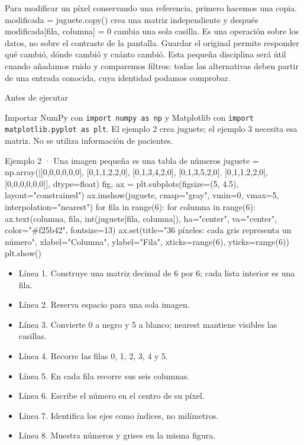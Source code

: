 Para modificar un píxel conservando una referencia, primero hacemos una copia. modificada = juguete.copy() crea una matriz independiente y después modificada[fila, columna] = 0 cambia una sola casilla. Es una operación sobre los datos, no sobre el contraste de la pantalla. Guardar el original permite responder qué cambió, dónde cambió y cuánto cambió. Esta pequeña disciplina será útil cuando añadamos ruido y comparemos filtros: todas las alternativas deben partir de una entrada conocida, cuya identidad podamos comprobar.



\begin{Idea}{Antes de ejecutar}

Importar NumPy con \texttt{import numpy as np} y Matplotlib con \texttt{import matplotlib.pyplot as plt}. El ejemplo 2 crea juguete; el ejemplo 3 necesita esa matriz. No se utiliza información de pacientes.


\end{Idea}

\begin{Codigo}{Ejemplo 2 · Una imagen pequeña es una tabla de números}
juguete = np.array([[0,0,0,0,0,0], [0,1,1,2,2,0], [0,1,3,4,2,0], [0,1,3,5,2,0], [0,1,1,2,2,0], [0,0,0,0,0,0]], dtype=float)
fig, ax = plt.subplots(figsize=(5, 4.5), layout="constrained")
ax.imshow(juguete, cmap="gray", vmin=0, vmax=5, interpolation="nearest")
for fila in range(6):
    for columna in range(6):
        ax.text(columna, fila, int(juguete[fila, columna]), ha="center", va="center", color="#f25b42", fontsize=13)
ax.set(title="36 píxeles: cada gris representa un número", xlabel="Columna", ylabel="Fila", xticks=range(6), yticks=range(6))
plt.show()
\end{Codigo}


\begin{itemize}

\item Línea 1. Construye una matriz decimal de 6 por 6; cada lista interior es una fila.

\item Línea 2. Reserva espacio para una sola imagen.

\item Línea 3. Convierte 0 a negro y 5 a blanco; nearest mantiene visibles las casillas.

\item Línea 4. Recorre las filas 0, 1, 2, 3, 4 y 5.

\item Línea 5. En cada fila recorre sus seis columnas.

\item Línea 6. Escribe el número en el centro de su píxel.

\item Línea 7. Identifica los ejes como índices, no milímetros.

\item Línea 8. Muestra números y grises en la misma figura.

\end{itemize}

